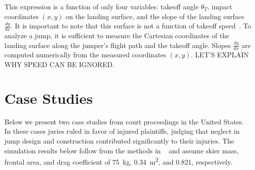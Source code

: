 \documentclass{article}
\begin{document}
This expression is  a function of only four variables: takeoff angle
$\theta_T$, impact coordinates $(x,y)$ on the landing surface, and the slope of
the landing surface $\frac{dy}{dx}$. It is important to note that this surface
is not a function of takeoff speed~. To analyze a jump, it is sufficient to
measure the Cartesian coordinates of the landing surface along the jumper's
flight path and the takeoff angle. Slopes $\frac{dy}{dx}$ are computed
numerically from the measured coordinates $(x,y)$.  LET'S EXPLAIN WHY SPEED CAN
BE IGNORED.

\section{Case Studies}
%
Below we present two case studies from court proceedings in the United States.
In these cases juries ruled in favor of injured plaintiffs, judging that
neglect in jump design and construction contributed significantly to their
injuries. The simulation results below follow from the methods in ~\cite{Levy2015} and assume skier mass, frontal area, and drag coefficient of 75~\si{\kg}, 0.34~\si{\meter\squared}, and 0.821, respectively.
\end{document}
